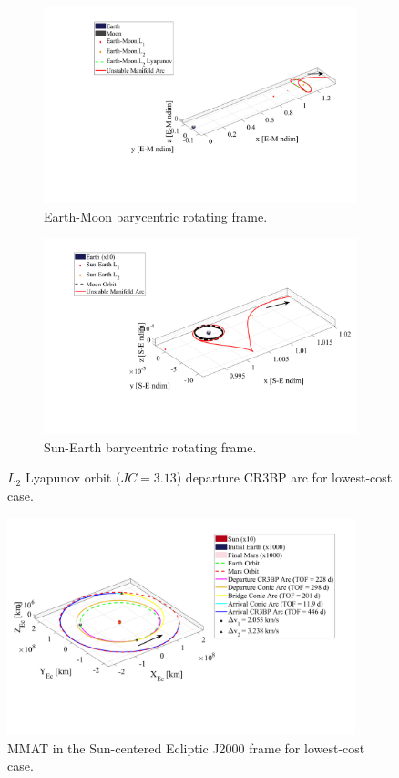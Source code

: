 \begin{figure}[!htb]
    \begin{subfigure}[h]{0.495\linewidth}
        \includegraphics[width=\textwidth]{figures/BestEM.pdf}
        \caption{Earth-Moon barycentric rotating frame.}
    \end{subfigure}
    \hfill
    \begin{subfigure}[h]{0.495\linewidth}
        \includegraphics[width=\textwidth]{figures/BestSE.pdf}
        \caption{Sun-Earth barycentric rotating frame.}
    \end{subfigure}
    \caption{$L_{2}$ Lyapunov orbit ($JC=3.13$) departure CR3BP arc for lowest-cost case.}
    \label{fig:bestE}
\end{figure}

\begin{figure}[!htb]
    \centering
    \includegraphics[width=0.9\textwidth]{figures/BestMMAT.pdf}
    \caption{MMAT in the Sun-centered Ecliptic J2000 frame for lowest-cost case.}
    \label{fig:bestMMAT}
\end{figure}
